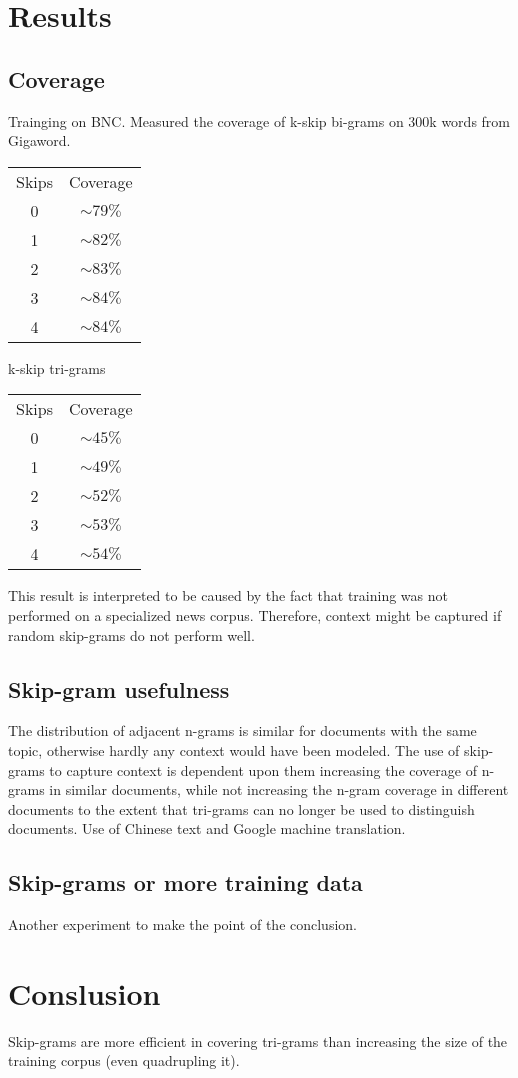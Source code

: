 \documentclass{article}
\begin{document}
\section{Results}

\subsection{Coverage}

Trainging on BNC. Measured the coverage of k-skip bi-grams on 300k words from Gigaword.

\begin{tabular}{c|c}
  Skips & Coverage \\
  0 & $\sim 79\%$ \\
  1 & $\sim 82\%$ \\
  2 & $\sim 83\%$ \\
  3 & $\sim 84\%$ \\
  4 & $\sim 84\%$ \\
\end{tabular}

k-skip tri-grams

\begin{tabular}{c|c}
  Skips & Coverage \\
  0 & $\sim 45\%$ \\
  1 & $\sim 49\%$ \\
  2 & $\sim 52\%$ \\
  3 & $\sim 53\%$ \\
  4 & $\sim 54\%$ \\
\end{tabular}

This result is interpreted to be caused by the fact that training was not performed on a specialized news corpus.
Therefore, context might be captured if random skip-grams do not perform well.

\subsection{Skip-gram usefulness}

The distribution of adjacent n-grams is similar for documents with the same topic, otherwise hardly any context would have been modeled.
The use of skip-grams to capture context is dependent upon them increasing the coverage of n-grams in similar documents, while not increasing the n-gram coverage in different documents to the extent that tri-grams can no longer be used to distinguish documents.
Use of Chinese text and Google machine translation.

\subsection{Skip-grams or more training data}

Another experiment to make the point of the conclusion.

\section{Conslusion}

Skip-grams are more efficient in covering tri-grams than increasing the size of the training corpus (even quadrupling it).
\end{document}
